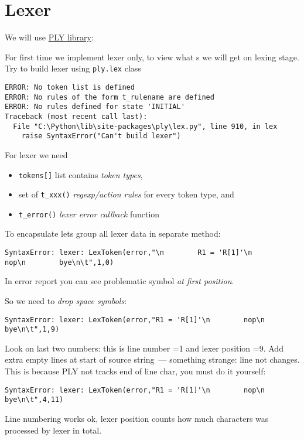 \section{Lexer}

We will use \href{http://www.dabeaz.com/ply/}{PLY library}:


For first time we implement lexer only, to view what s we will get
on lexing stage. Try to build lexer using \verb|ply.lex| class

\begin{lstlisting}
ERROR: No token list is defined
ERROR: No rules of the form t_rulename are defined
ERROR: No rules defined for state 'INITIAL'
Traceback (most recent call last):
  File "C:\Python\lib\site-packages\ply\lex.py", line 910, in lex
    raise SyntaxError("Can't build lexer")
\end{lstlisting}

For lexer we need 
\begin{itemize}
  \item \verb|tokens[]| list contains \emph{token types}, 
  \item set of \verb|t_xxx()| \emph{regexp/action rules} for every token type,
  and
  \item \verb|t_error()| \emph{lexer error callback} function 
\end{itemize}
To encapsulate lets group all lexer data in separate method:



\begin{lstlisting}
SyntaxError: lexer: LexToken(error,"\n        R1 = 'R[1]'\n        nop\n        bye\n\t",1,0)
\end{lstlisting}

In error report you can see problematic symbol \emph{at first position}.

So we need to \emph{drop space symbols}:

\begin{lstlisting}
SyntaxError: lexer: LexToken(error,"R1 = 'R[1]'\n        nop\n        bye\n\t",1,9)
\end{lstlisting}
Look on last two numbers: this is line number =1 and lexer position =9. Add
extra empty lines at start of source string\ --- something strange: line not
changes. This is because PLY not tracks end of line char, you must do it
yourself:

\begin{lstlisting}
SyntaxError: lexer: LexToken(error,"R1 = 'R[1]'\n        nop\n       
bye\n\t",4,11)
\end{lstlisting}
Line numbering works ok, lexer position counts how much characters was processed
by lexer in total.

